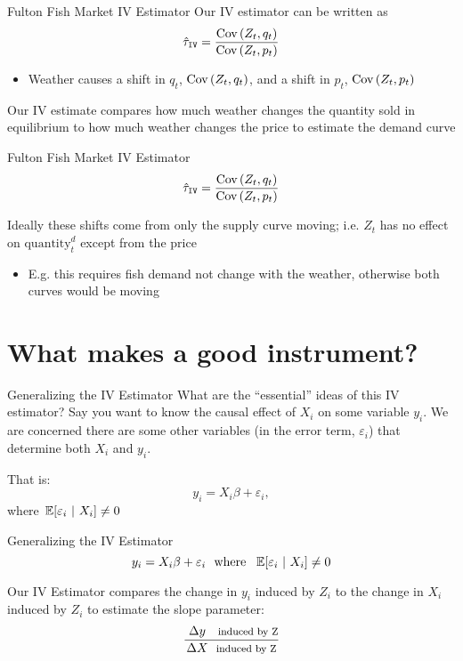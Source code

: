 \documentclass[aspectratio=169,t,11pt,table]{beamer}
\begin{document}
\begin{frame}{Fulton Fish Market IV Estimator}
  Our IV estimator can be written as
  $$
    \hat{\tau}_{\texttt{IV}} = \frac{\cov{Z_t, q_t}}{\cov{Z_t, p_t}}
  $$

  \begin{itemize}
    \item Weather causes a shift in $q_t$, $\cov{Z_t, q_t}$, and a shift in $p_t$, $\cov{Z_t, p_t}$
  \end{itemize}

  \bigskip
  Our IV estimate compares how much weather changes the quantity sold in equilibrium to how much weather changes the price to estimate the demand curve
\end{frame}

\begin{frame}{Fulton Fish Market IV Estimator}
  \vspace{-\bigskipamount}
  $$
    \hat{\tau}_{\texttt{IV}} = \frac{\cov{Z_t, q_t}}{\cov{Z_t, p_t}}
  $$

  \bigskip
  Ideally these shifts come from only the supply curve moving; i.e. $Z_t$ has no effect on $\text{quantity}_t^d$ except from the price
  \begin{itemize}
    \item E.g. this requires fish demand not change with the weather, otherwise both curves would be moving
  \end{itemize}
\end{frame}

\section{What makes a good instrument?}

\begin{frame}{Generalizing the IV Estimator}
  What are the ``essential'' ideas of this IV estimator? Say you want to know the causal effect of $X_i$ on some variable $y_i$. We are concerned there are some other variables (in the error term, $\varepsilon_i$) that determine both $X_i$ and $y_i$.

  That is:
  $$
    y_i = X_i \beta + \varepsilon_i,
  $$
  where $\expec{\varepsilon_i}{X_i} \neq 0$
\end{frame}

\begin{frame}{Generalizing the IV Estimator}
  \vspace{-\bigskipamount}
  $$
    y_i = X_i \beta + \varepsilon_i \ \text{ where }\ \expec{\varepsilon_i}{X_i} \neq 0
  $$

  \bigskip
  Our IV Estimator compares the change in $y_i$ induced by $Z_i$ to the change in $X_i$ induced by $Z_i$ to estimate the slope parameter:
  $$
    \frac{\ \Delta y \text{\ \ \  \footnotesize induced by Z} }{ \Delta X \text{\ \ \footnotesize induced by Z} }
  $$
\end{frame}
\end{document}
